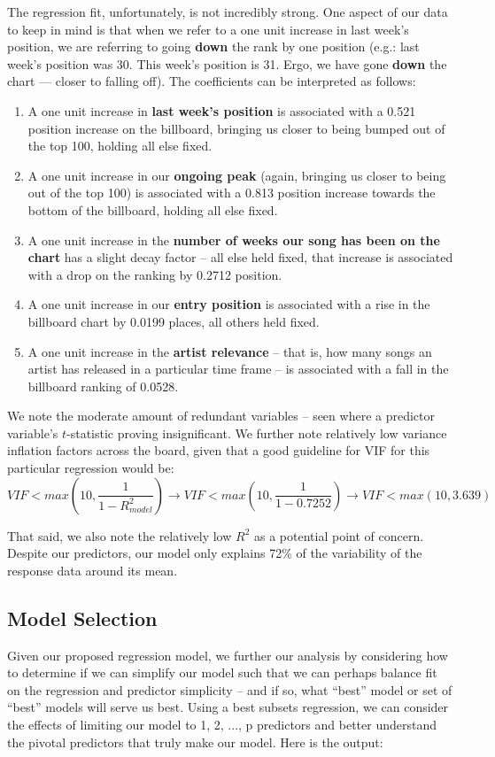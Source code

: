 \documentclass[11pt]{article} %
\begin{document}
The regression fit, unfortunately, is not incredibly strong. One aspect of our data to keep in mind is that when we refer to a one unit increase in last week's position, we are referring to going \textbf{down} the rank by one position (e.g.: last week's position was 30. This week's position is 31. Ergo, we have gone \textbf{down} the chart --- closer to falling off). The coefficients can be interpreted as follows:
\begin{enumerate}
	\item A one unit increase in \textbf{last week's position} is associated with a 0.521 position increase on the billboard, bringing us closer to being bumped out of the top 100, holding all else fixed.
	\item A one unit increase in our \textbf{ongoing peak} (again, bringing us closer to being out of the top 100) is associated with a 0.813 position increase towards the bottom of the billboard, holding all else fixed.
	\item A one unit increase in the \textbf{number of weeks our song has been on the chart} has a slight decay factor -- all else held fixed, that increase is associated with a drop on the ranking by 0.2712 position.
	\item A one unit increase in our \textbf{entry position} is associated with a rise in the billboard chart by 0.0199 places, all others held fixed.
	\item A one unit increase in the \textbf{artist relevance} -- that is, how many songs an artist has released in a particular time frame -- is associated with a fall in the billboard ranking of 0.0528.
\end{enumerate}

We note the moderate amount of redundant variables -- seen where a predictor variable's $t$-statistic proving insignificant. We further note relatively low variance inflation factors across the board, given that a good guideline for VIF for this particular regression would be:
\[ VIF < max(10, \frac{1}{1 - R^{2}_{model}}) \rightarrow VIF < max(10, \frac{1}{1 - 0.7252}) \rightarrow VIF < max(10, 3.639)\]

That said, we also note the relatively low $R^{2}$ as a potential point of concern. Despite our predictors, our model only explains 72\% of the variability of the response data around its mean. 

\subsection*{Model Selection}
Given our proposed regression model, we further our analysis by considering how to determine if we can simplify our model such that we can perhaps balance fit on the regression and predictor simplicity -- and if so, what ``best'' model or set of ``best'' models will serve us best. Using a best subsets regression, we can consider the effects of limiting our model to 1, 2, ..., p predictors and better understand the pivotal predictors that truly make our model. Here is the output:
\end{document}

